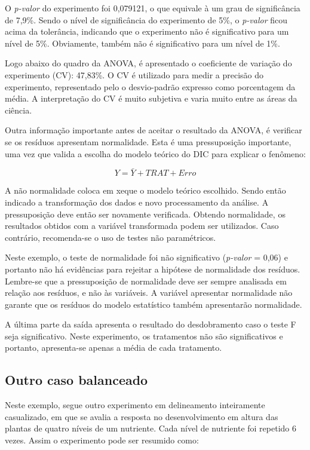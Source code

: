 \documentclass[
]{article}
\begin{document}
O \emph{p-valor} do experimento foi 0,079121, o que equivale à um grau de significância de 7,9\%. Sendo o nível de significância do experimento de 5\%, o \emph{p-valor} ficou acima da tolerância, indicando que o experimento não é significativo para um nível de 5\%. Obviamente, também não é significativo para um nível de 1\%.

Logo abaixo do quadro da ANOVA, é apresentado o coeficiente de variação do experimento (CV): 47,83\%. O CV é utilizado para medir a precisão do experimento, representado pelo o desvio-padrão expresso como porcentagem da média. A interpretação do CV é muito subjetiva e varia muito entre as áreas da ciência.

Outra informação importante antes de aceitar o resultado da ANOVA, é verificar se os resíduos apresentam normalidade. Esta é uma pressuposição importante, uma vez que valida a escolha do modelo teórico do DIC para explicar o fenômeno:

\[Y = \bar{Y} + TRAT + Erro\]

A não normalidade coloca em xeque o modelo teórico escolhido. Sendo então indicado a transformação dos dados e novo processamento da análise. A pressuposição deve então ser novamente verificada. Obtendo normalidade, os resultados obtidos com a variável transformada podem ser utilizados. Caso contrário, recomenda-se o uso de testes não paramétricos.

Neste exemplo, o teste de normalidade foi não significativo (\emph{p-valor} = 0,06) e portanto não há evidências para rejeitar a hipótese de normalidade dos resíduos. Lembre-se que a pressuposição de normalidade deve ser sempre analisada em relação aos resíduos, e não às variáveis. A variável apresentar normalidade não garante que os resíduos do modelo estatístico também apresentarão normalidade.

A última parte da saída apresenta o resultado do desdobramento caso o teste F seja significativo. Neste experimento, os tratamentos não são significativos e portanto, apresenta-se apenas a média de cada tratamento.

\hypertarget{outro-caso-balanceado}{%
\subsection{Outro caso balanceado}\label{outro-caso-balanceado}}

Neste exemplo, segue outro experimento em delineamento inteiramente casualizado, em que se avalia a resposta no desenvolvimento em altura das plantas de quatro níveis de um nutriente. Cada nível de nutriente foi repetido 6 vezes. Assim o experimento pode ser resumido como:
\end{document}
